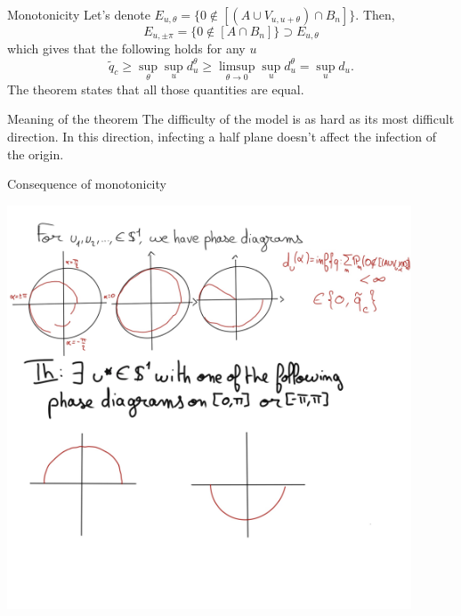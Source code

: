 \begin{frame}{Monotonicity}
	Let's denote $E_{u, \theta} = \{0\not\in [(A\cup V_{u, u+\theta})\cap B_n]\}$. Then,
	\begin{equation*}
		E_{u, \pm\pi} = \{ 0 \not\in [A\cap B_n]\} \supset E_{u, \theta}
	\end{equation*}
	which gives that the following holds for any $u$
	\begin{equation*}
		\tilde q_c \geq \sup_\theta \sup_u d_u^\theta \geq \limsup_{\theta\to 0} \sup_u d_u^\theta = \sup_u d_u.
	\end{equation*}
	The theorem states that all those quantities are equal. 
	\begin{block}{Meaning of the theorem}
		The difficulty of the model is as hard as its most difficult direction. In this direction, infecting a half plane doesn't affect the infection of the origin.
	\end{block}
\end{frame}

\begin{frame}{Consequence of monotonicity}
	\begin{center}
    	 	\includegraphics[width=0.9\textwidth]{semi_circ.jpg}
	\end{center}
\end{frame}

